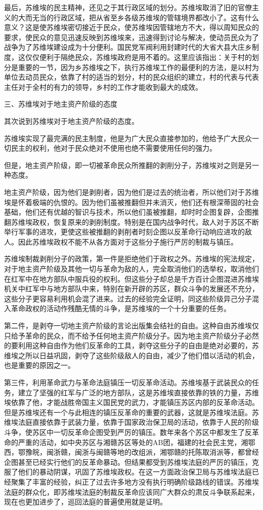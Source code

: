 最后，苏维埃的民主精神，还见之于其行政区域的划分。苏维埃取消了旧的官僚主义的大而无当的行政区域，把从省至乡各级苏维埃的管辖境界都改小了。这有什么意义？这是使苏维埃密切接近于民众，使苏维埃因管辖地方不大，得以周知民众的要求，使民众的意见迅速反映到苏维埃来，迅速得到讨论与解决，使动员民众为了战争为了苏维埃建设成为十分便利。国民党军阀利用封建时代的大省大县大庄乡制度，这仅仅便利于隔绝民众，苏维埃政府是用不着的。这里应该指出：关于村的划分是重要的一节，因为乡苏维埃之下，执行苏维埃工作的最便利的方法，是以村为单位去动员民众，依靠了村的适当的划分，村的民众组织的建立，村的代表与代表主任对于全村的有力的领导，乡村的工作才能收到最大的成效。

三、苏维埃对于地主资产阶级的态度

其次说到苏维埃对于地主资产阶级的态度。

苏维埃实现了最完满的民主制度，他是为广大民众直接参加的，他给予广大民众一切民主的权利，他对于民众绝对不使用也绝不需要使用任何的强力。

但是，地主资产阶级，即一切被革命民众所推翻的剥削分子，苏维埃对之则是另一种态度。

地主资产阶级，因为他们是剥削者，因为他们是过去的统治者，所以他们对于苏维埃是怀着极端的仇恨的。因为他们虽被推翻但并未消灭，他们还有根深蒂固的社会基础，他们还有优越的智识与技术，所以他们虽被推翻，却时时企图复辟，企图推翻苏维埃政权，恢复原来的剥削制度。特别是在国内战争时代，敌人对于苏区不断举行军事的进攻，更使这些被推翻的剥削者时刻企图以反革命行动响应进攻的敌人。因此苏维埃政权不能不从各方面对于这些分子施行严厉的制裁与镇压。

苏维埃制裁剥削分子的政策，第一件是拒绝他们于政权之外。苏维埃的宪法规定，对于地主资产阶级及其他一切与革命为敌的人，完全取消他们的选举权，取消他们在红军中在地方部队中服兵役的权利。但这些分子却总是千方百计企图混进苏维埃机关中红军中与地方部队中来，特别在新开辟的苏区，群众斗争的发展还不充分，这些分子更容易利用机会混了进来。过去的经验完全证明，同这些阶级异己分子混入革命政权的活动作残酷无情的斗争，是苏维埃的一个十分重要的任务。

第二件，是剥夺一切地主资产阶级的言论出版集会结社的自由。这种自由苏维埃仅只给予革命的民众，而不给予任何地主资产阶级分子。因为地主资产阶级分子必然的要利用这种自由作为他们反革命的工具，剥夺这些分子的自由是绝对必要的，苏维埃之所以日益巩固，剥夺了这些阶级敌人的自由，减少了他们借以活动的机会，也是重要的原因之一。

第三件，利用革命武力与革命法庭镇压一切反革命活动。苏维埃基于武装民众的任务，建立了坚强的红军与广泛的地方部队，这是苏维埃直接依靠的铁的力量，苏维埃依靠了他，才能战胜帝国主义国民党的武力，才能镇压苏区内部的反革命活动。但是苏维埃还有一个与此相连的镇压反革命的重要的武器，这就是苏维埃法庭。苏维埃法庭直接依靠于武装力量，依靠于国家政治保卫局的活动，依靠于人民的阶级斗争，使苏区中一切反革命企图受到严厉的镇压。数年来各个苏区中都发生了反革命的严重的活动，如中央苏区与湘赣苏区等处的AB团，福建的社会民主党，湘鄂西，鄂豫皖，闽浙赣，闽浙与闽赣等地的改组派，湘鄂赣的托陈取消派等，都曾经企图甚至已经实行他们的反革命暴动。但结果都受到苏维埃法庭的严厉的镇压，克服了他们的暴动阴谋，巩固了苏维埃政权。在这一方面政治保卫局与苏维埃法庭已经聚集了丰富的经验，纠正了过去许多地方没有执行明确阶级路线的错误。苏维埃法庭的群众化，即苏维埃法庭的制裁反革命应该同广大群众的肃反斗争联系起来，现在也更加进步了，巡回法庭的普遍使用就是证明。

